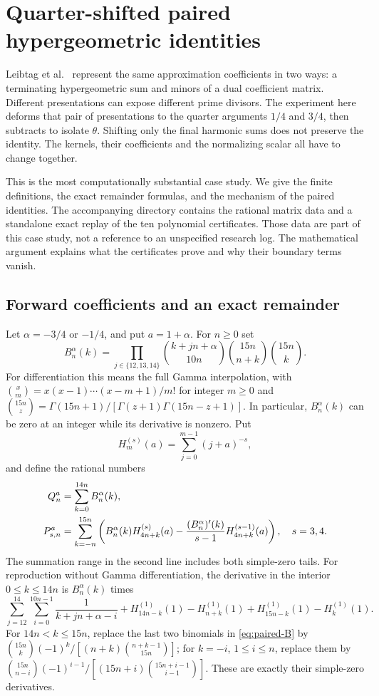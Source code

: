 \section{Quarter-shifted paired hypergeometric identities}
\label{sec:paired-case}
Leibtag et al.~\cite[Section 6.2]{Leibtag} represent the same
approximation coefficients in two ways: a terminating hypergeometric
sum and minors of a dual coefficient matrix. Different presentations
can expose different prime divisors. The experiment here deforms that
pair of presentations to the quarter arguments $1/4$ and $3/4$, then
subtracts to isolate $\theta$. Shifting only the final harmonic sums
does not preserve the identity. The kernels, their coefficients and
the normalizing scalar all have to change together.

This is the most computationally substantial case study. We give the
finite definitions, the exact remainder formulas, and the mechanism
of the paired identities. The accompanying directory
 contains the rational matrix data and a standalone
exact replay of the ten polynomial certificates. Those data are part
of this case study, not a reference to an unspecified research log.
The mathematical argument explains what the certificates prove and
why their boundary terms vanish.

\subsection{Forward coefficients and an exact remainder}
Let $\alpha=-3/4$ or $-1/4$, and put $a=1+\alpha$. For $n\geq0$ set
\begin{equation}\label{eq:paired-B}
 B_n^\alpha(k)=\prod_{j\in\{12,13,14\}}
                 \binom{k+jn+\alpha}{10n}
                     \binom{15n}{n+k}\binom{15n}{k}.
\end{equation}
For differentiation this means the full Gamma interpolation, with
$\binom{x}{m}=x(x-1)\cdots(x-m+1)/m!$ for integer $m\geq0$ and
$\binom{15n}{z}=\Gamma(15n+1)/[\Gamma(z+1)\Gamma(15n-z+1)]$.
In particular, $B_n^\alpha(k)$ can be zero at an integer while its
derivative is nonzero. Put
\[
 H_m^{(s)}(a)=\sum_{j=0}^{m-1}(j+a)^{-s},
\]
and define the rational numbers
\begin{align}
 Q_n^a&=\sum_{k=0}^{14n}B_n^\alpha(k),\notag\\
 P_{s,n}^a&=\sum_{k=-n}^{15n}\left(
 B_n^\alpha(k)H_{4n+k}^{(s)}(a)
 -\frac{(B_n^\alpha)'(k)}{s-1}H_{4n+k}^{(s-1)}(a)\right),
 \quad s=3,4.\label{eq:paired-forward}
\end{align}
The summation range in the second line includes both simple-zero tails.
For reproduction without Gamma differentiation, the derivative in the
interior $0\leq k\leq14n$ is $B_n^\alpha(k)$ times
\[
 \sum_{j=12}^{14}\sum_{i=0}^{10n-1}\frac1{k+jn+\alpha-i}
 +H_{14n-k}^{(1)}(1)-H_{n+k}^{(1)}(1)
 +H_{15n-k}^{(1)}(1)-H_k^{(1)}(1).
\]
For $14n<k\leq15n$, replace the last two binomials in
\eqref{eq:paired-B} by
$\binom{15n}{k}(-1)^k/[(n+k)\binom{n+k-1}{15n}]$;
for $k=-i$, $1\leq i\leq n$, replace them by
$\binom{15n}{n-i}(-1)^{i-1}/[(15n+i)\binom{15n+i-1}{i-1}]$.
These are exactly their simple-zero derivatives.

